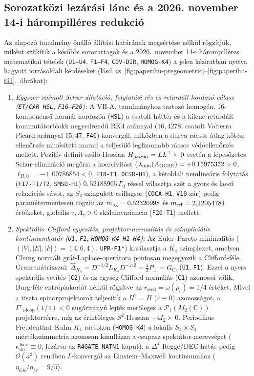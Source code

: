 \documentclass[12pt]{article}
\begin{document}
\subsection{Sorozatközi lezárási lánc és a 2026. november 14-i hárompilléres redukció}
\label{sec:foundations-f16-f20-hu-20261112}\hypertarget{f16f20paperihu}{}
Az alapozó tanulmány önálló állítási határának megsértése nélkül rögzítjük, miként szűkítik a későbbi sorozattagok és a 2026.\ november 14-i hárompilléres matematikai tételek (\texttt{U1--U4}, \texttt{F1--F4}, \texttt{COV-DIR}, \texttt{HOMOG-K4}) a jelen kéziratban nyitva hagyott forrásoldali kérdéseket (lásd az~\ref{fig:paperihu-pregeometric}--\ref{fig:paperihu-f41}.~ábrákat):
\begin{enumerate}
\item \emph{Egyszer számolt Schur-dilatáció, folytatási rés és retardált hordozó-válasz (\texttt{ET/CAR HSL}, \texttt{F16--F20}):} A VII-A. tanulmányhoz tartozó homogén, 16-komponensű normál hordozón (\texttt{HSL}) a csatolt háttér és a kilenc retardált kommutátorblokk negyedrendű RK4 aránnyal ($16{,}4278$; csatolt Volterra Picard-aránnyal $15{,}47$, \texttt{F40}) konvergál, miközben a durva rácsos átlag-kötési ellenőrzés minősített marad a teljesülő legfinomabb rácsos védőellenőrzés mellett. Pozitív definit szülő-Hessian $H_{\rm parent}=LL^\top\succ 0$ esetén a lépcsőzetes Schur-elimináció megőrzi a koercivitást ($\lambda_{\min}(A_{\rm OCSR})=+0{,}15975372>0$, $\ell_{H,0}=-1{,}00786854<0$, \texttt{F18-T1}, \texttt{OCSR-H1}), a kétoldali nemlineáris folytatás (\texttt{F17-T1/T2}, \texttt{SMSD-H1}) $0{,}52188905\,\Gamma_0$ réssel választja szét a gyors és lassú relaxációs sávot, az $S_4$-szingulett csillagsor (\texttt{COCA-H1}, \texttt{V19}-zár) pedig paramétermentesen rögzíti az $m_{\rm bg}=0{,}52320998$ és $m_{\rm eff}=2{,}12054781$ értékeket, globális $\tau,A_\tau>0$ skálainvariancia (\texttt{F20-T1}) mellett.
\item \emph{Spektrális--Clifford egyesítés, projektor-normalitás és szimpliciális kontinuumhatár (\texttt{U1}, \texttt{F1}, \texttt{HOMOG-K4 H1--H4}):} Az Euler--Pareto-minimalitás ($(|V|,|E|,|F|)=(4,6,4)$, \texttt{UPR-P1*}) kiválasztja a $K_4$ szimplexet, amelyen Chung normált gráf-Laplace-operátora pontosan megegyezik a Clifford-féle Gram-mátrixszal: $\widehat{\Delta}_{K_4}=D^{-1/2}L_{K_4}D^{-1/2}=\frac{4}{3}P_\perp=G_{\mathrm{Cl}}$ (\texttt{U1}, \texttt{F1}). Ezzel a nyers spektrális vetítés (\texttt{C2}) és az egység-Clifford normálás (\texttt{C1}) azonossá válik, Burg-féle entrópiakorlát nélkül rögzítve az $r_{\mathrm{seed}}=\omega(p_i)=1/4$ értéket. Mivel a tiszta spinorprojektorok teljesítik a $\Pi^2=\Pi$ ($\dot{r}\equiv 0$) azonosságot, a $\Gamma'_{1\text{-loop}}(1/4)<0$ sugárirányú lejtés merőleges a $\mathcal{P}_1(M_2(\mathbb{C}))$ projektortérre, míg az érintőleges $S^2$-Hessian $+4I_2\succ 0$. Periodikus Freudenthal--Kuhn $K_4$ rácsokon (\texttt{HOMOG-K4}) a lokális $S_4\times S_4$ mértékszimmetria azonosan kinullázza a csupasz spektátor-merevséget ($\kappa_{\mathrm{dir}}^{\mathrm{bare}}\equiv 0$, lezárva az \texttt{R4GATE-NATN1} kaput), a $\Delta^4$ Regge/DEC hatás pedig $\mathcal{O}(a^2)$ rendben $\Gamma$-konvergál az Einstein--Maxwell kontinuumhoz ($\eta_{\mathrm{EH}}/\eta_M=9/5$).

\end{enumerate}
\end{document}
